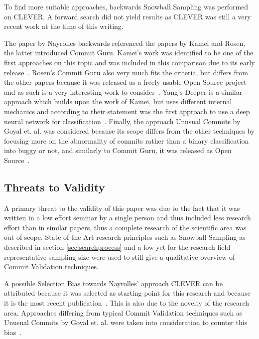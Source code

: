 To find more suitable approaches, backwards Snowball Sampling was performed on CLEVER. A forward search did not yield results as CLEVER was still a very recent work at the time of this writing.

The paper by Nayrolles backwards referenced the papers by Kamei and Rosen, the latter introduced Commit Guru. Kamei's work was identified to be one of the first approaches on this topic and was included in this comparison due to its early release~\cite{Kamei2013}. Rosen's Commit Guru also very much fits the criteria, but differs from the other papers because it was released as a freely usable Open-Source project and as such is a very interesting work to consider~\cite{Rosen2015}. Yang's Deeper is a similar approach which builds upon the work of Kamei, but uses different internal mechanics and according to their statement was the first approach to use a deep neural network for classification~\cite{Yang2015}. Finally, the approach Unusual Commits by Goyal et. al. was considered because its scope differs from the other techniques by focusing more on the abnormality of commits rather than a binary classification into buggy or not, and similarly to Commit Guru, it was released as Open Source~\cite{Goyal2017}.

\subsection{Threats to Validity}

A primary threat to the validity of this paper was due to the fact that it was written in a low effort seminar by a single person and thus included less research effort than in similar papers, thus a complete research of the scientific area was out of scope. State of the Art research principles such as Snowball Sampling as described in section \ref{sec:searchprocess} and a low yet for the research field representative sampling size were used to still give a qualitative overview of Commit Validation techniques.

A possible Selection Bias towards Nayrolles' approach CLEVER can be attributed because it was selected as starting point for this research and because it is the most recent publication~\cite{Nayrolles2018}. This is also due to the novelty of the research area. Approaches differing from typical Commit Validation techniques such as Unusual Commits by Goyal et. al. were taken into consideration to counter this bias~\cite{Goyal2017}.

